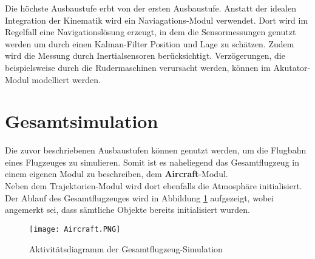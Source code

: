 Die höchste Ausbaustufe erbt von der ersten Ausbaustufe. Anstatt der idealen Integration der Kinematik wird ein Naviagations-Modul verwendet. Dort wird im Regelfall eine Navigationslösung erzeugt, in dem die Sensormessungen genutzt werden um durch einen Kalman-Filter Position und Lage zu schätzen. Zudem wird die Messung durch Inertialsensoren berücksichtigt. Verzögerungen, die beispielsweise durch die Rudermaschinen verursacht werden, können im Akutator-Modul modelliert werden.

\section{Gesamtsimulation}
Die zuvor beschriebenen Ausbaustufen können genutzt werden, um die Flugbahn eines Flugzeuges zu simulieren. Somit ist es naheliegend das Gesamtflugzeug in einem eigenen Modul zu beschreiben, dem \textbf{Aircraft}-Modul.\\
Neben dem Trajektorien-Modul wird dort ebenfalls die Atmosphäre initialisiert. Der Ablauf des Gesamtflugzeuges wird in Abbildung \ref{fig:Aircraft} aufgezeigt, wobei angemerkt sei, dass sämtliche Objekte bereits initialisiert wurden.
\begin{figure}[h]
	\texttt{[image: Aircraft.PNG]}
	\label{fig:Aircraft}
	\caption{Aktivitätsdiagramm der Gesamtflugzeug-Simulation}
\end{figure}\\
